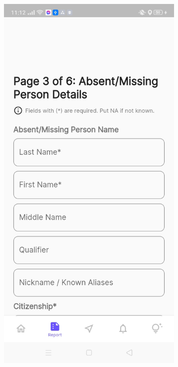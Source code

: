 \begin{figure}[!h]
\begin{subfigure}[c]{0.30\linewidth}
        \includegraphics[scale=0.15]{figures/Chapter4/Main/p3-1.jpg}
    \end{subfigure}
    \centering
    \begin{subfigure}[c]{0.30\linewidth}

\end{subfigure}
\end{figure}
